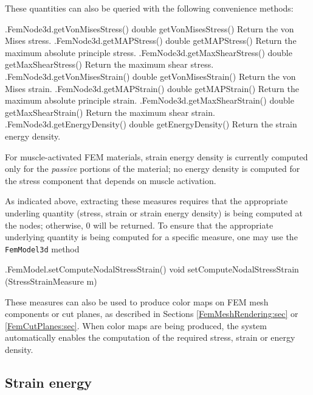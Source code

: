 These quantities can also be queried with the following convenience
methods:
%
\begin{methodtable}{0.45}{0.55}
\midline
%
\methodentry
{\fem.FemNode3d.getVonMisesStress()}%
{double getVonMisesStress()}%
{Return the von Mises stress.}%
%
\methodentry
{\fem.FemNode3d.getMAPStress()}%
{double getMAPStress()}%
{Return the maximum absolute principle stress.}%
%
\methodentry
{\fem.FemNode3d.getMaxShearStress()}%
{double getMaxShearStress()}%
{Return the maximum shear stress.}%
%
\methodentry
{\fem.FemNode3d.getVonMisesStrain()}%
{double getVonMisesStrain()}%
{Return the von Mises strain.}%
%
\methodentry
{\fem.FemNode3d.getMAPStrain()}%
{double getMAPStrain()}%
{Return the maximum absolute principle strain.}%
%
\methodentry
{\fem.FemNode3d.getMaxShearStrain()}%
{double getMaxShearStrain()}%
{Return the maximum shear strain.}%
%
\methodentry
{\fem.FemNode3d.getEnergyDensity()}%
{double getEnergyDensity()}%
{Return the strain energy density.}%
%
\midline
\end{methodtable}
%

\begin{sideblock}
For muscle-activated FEM materials, strain energy density is currently
computed only for the {\it passive} portions of the material; no energy
density is computed for the stress component that depends on muscle
activation.
\end{sideblock}

As indicated above, extracting these measures requires that the
appropriate underling quantity (stress, strain or strain energy
density) is being computed at the nodes; otherwise, 0 will be
returned. To ensure that the appropriate underlying quantity is being
computed for a specific measure, one may use the {\tt
FemModel3d} method
%
\begin{methodtable}{0.6}{0.4}
%
\methodentry
{\fem.FemModel.setComputeNodalStressStrain()}%
{void setComputeNodalStressStrain (StressStrainMeasure m)}%
{}%
%
\end{methodtable}

These measures can also be used to produce color maps on FEM mesh
components or cut planes, as described in
Sections \ref{FemMeshRendering:sec} or \ref{FemCutPlanes:sec}.  When
color maps are being produced, the system automatically enables the
computation of the required stress, strain or energy density.

\subsection{Strain energy}

